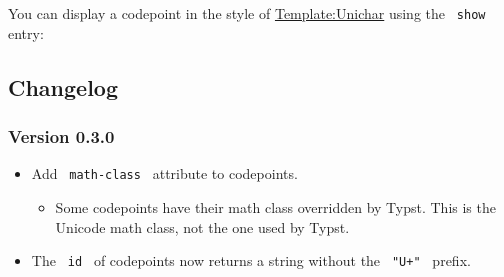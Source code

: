 \begin{Shaded}
\begin{Highlighting}[]
\end{Highlighting}
\end{Shaded}

\pandocbounded{}

You can display a codepoint in the style of
\href{https://en.wikipedia.org/wiki/Template:Unichar}{Template:Unichar}
using the \texttt{\ show\ } entry:

\begin{Shaded}
\begin{Highlighting}[]
\end{Highlighting}
\end{Shaded}

\pandocbounded{}

\subsection{Changelog}\label{changelog}

\subsubsection{Version 0.3.0}\label{version-0.3.0}

\begin{itemize}
\item
  Add \texttt{\ math-class\ } attribute to codepoints.

  \begin{itemize}
  \tightlist
  \item
    Some codepoints have their math class overridden by Typst. This is
    the Unicode math class, not the one used by Typst.
  \end{itemize}
\item
  The \texttt{\ id\ } of codepoints now returns a string without the
  \texttt{\ "U+"\ } prefix.
\end{itemize}

